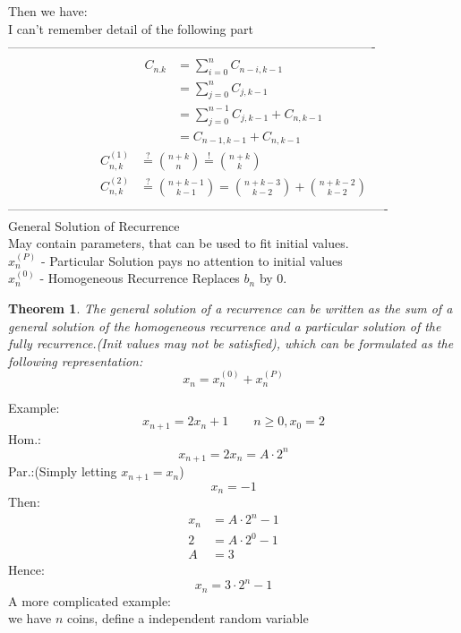 \documentclass{article}
\newtheorem{gsr}{Theorem}
\begin{document}
Then we have:\\
I can't remember detail of the following  part\\
----------------------------------------------------------------------------------------\\
\begin{align*}
C_{n.k}&=\sum_{i=0}^nC_{n-i,k-1}\\
&=\sum_{j=0}^nC_{j,k-1}\\
&=\sum_{j=0}^{n-1}C_{j,k-1}+C_{n,k-1}\\
&=C_{n-1,k-1}+C_{n,k-1}
\end{align*}
\begin{align*}
C_{n,k}^{(1)}&\overset{?}{=}\binom{n+k}{n}\overset{!}{=}\binom{n+k}{k}\\
C_{n,k}^{(2)}&\overset{?}{=}\binom{n+k-1}{k-1}=\binom{n+k-3}{k-2}+\binom{n+k-2}{k-2}
\end{align*}
-------------------------------------------------------------------------------------------\\
General Solution of Recurrence\\
May contain parameters, that can be used to fit initial values.\\
$x_n^{(P)}$ - Particular Solution pays no attention to initial values\\
$x_n^{(0)}$ - Homogeneous Recurrence Replaces $b_n$ by $0$.
\begin{gsr}
The general solution of a recurrence can be written as the sum of a
general solution of the homogeneous recurrence and a particular
solution of the fully recurrence.(Init values may not be satisfied),
which can be formulated as the following representation:\\
\[
x_n=x_n^{(0)}+x_n^{(P)}
\]
\end{gsr}
Example:\\
\[
x_{n+1}=2x_n+1\qquad n\geq0,x_0=2
\]
Hom.:\\
\[
x_{n+1}=2x_n=A\cdot 2^n
\]
Par.:(Simply letting $x_{n+1}=x_n$)\\
\[
x_n=-1
\]
Then:\\
\begin{align*}
x_n&=A\cdot 2^n-1\\
2&=A\cdot 2^0-1\\
A&=3
\end{align*}
Hence:\\
\[
x_n=3\cdot 2^n-1
\]
A more complicated example:\\
we have $n$ coins, define a independent random variable \\
\end{document}
